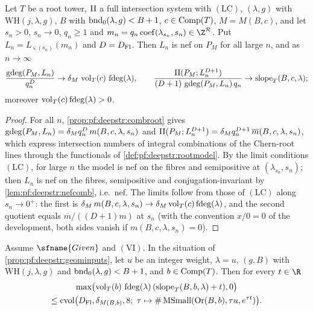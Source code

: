 \begin{lemma}\label{lem:pf:deepstr:towerseq}
Let $T$ be a root tower, $\mathrm{II}$ a full intersection system with $\mathrm{(LC)}$, $(\lambda,g)$ with
$\mathrm{WH}(j,\lambda,g)$, $B$ with $\operatorname{bnd}_0(\lambda,g)<B+1$, $c\in\operatorname{Comp}(T)$, $M=M(B,c)$, and let
$s_n>0$, $s_n\to0$, $q_n\ge1$ and $m_n=q_n\,\mathrm{coef}(\lambda_{s_n},s_n)\in\Z^{\mathcal R}$. Put
$L_n=L_{\varsigma(s_n)}(m_n)$ and $D=D_{\mathrm{Fl}}$. Then $L_n$ is nef on $P_M$ for all large $n$, and as
$n\to\infty$
\[
\frac{\operatorname{gdeg}(P_M,L_n)}{q_n^{D}}\to\delta_M\,\operatorname{vol}_T(c)\,\operatorname{fdeg}(\lambda),\qquad
\frac{\mathrm{II}(P_M;L_n^{D+1})}{(D+1)\,\operatorname{gdeg}(P_M,L_n)\,q_n}\to\operatorname{slope}_T(B,c,\lambda);
\]
moreover $\operatorname{vol}_T(c)\operatorname{fdeg}(\lambda)>0$.
\end{lemma}

\begin{proof}
For all $n$, \cref{prop:pf:deepstr:combroot} gives
$\operatorname{gdeg}(P_M,L_n)=\delta_Mq_n^{D}\,m(B,c,\lambda,s_n)$ and
$\mathrm{II}(P_M;L_n^{D+1})=\delta_Mq_n^{D+1}\,\overline m(B,c,\lambda,s_n)$, which express intersection numbers of
integral combinations of the Chern-root lines through the functionals of \cref{def:pf:deepstr:rootmodel}. By
the limit conditions $\mathrm{(LC)}$, for large $n$ the model is nef on the fibres and semipositive at
$(\lambda_{s_n},s_n)$; then $L_n$ is nef on the fibres, semipositive and conjugation-invariant by
\cref{lem:pf:deepstr:nefcomb}, i.e.\ nef. The limits follow from those of $\mathrm{(LC)}$ along $s_n\to0^+$: the
first is $\delta_M\,m(B,c,\lambda,s_n)\to\delta_M\operatorname{vol}_T(c)\operatorname{fdeg}(\lambda)$, and the second quotient equals
$\overline m/((D+1)m)$ at $s_n$ (with the convention $x/0=0$ of the development, both sides vanish if
$m(B,c,\lambda,s_n)=0$).
\end{proof}

\begin{proposition}\label{prop:pf:deepstr:volslope}
Assume $\sfname{Given}$ and $\mathrm{(VI)}$. In the situation of \cref{prop:pf:deepstr:geominputs}, let $u$ be an
integer weight, $\lambda=u$, $(g,B)$ with $\mathrm{WH}(j,\lambda,g)$ and $\operatorname{bnd}_0(\lambda,g)<B+1$, and
$b\in\operatorname{Comp}(T)$. Then for every $t\in\R$
\begin{multline*}
\max\bigl(\deepstrvol_T(b)\,\deepstrflagdeg(\lambda)\,(\deepstrslope_T(B,b,\lambda)+t),0\bigr)\\
\le\deepstrcvol\bigl(\deepstrDim,\delta_{M(B,b)},8;\ \tau\mapsto\#\deepstrmsmall(\mathrm{Or}(B,b),\tau u,e^{\tau t})\bigr).
\end{multline*}
\end{proposition}

